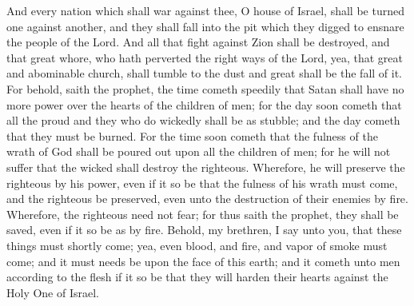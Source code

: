 And every nation which shall war against thee, O house of Israel, shall be turned one against another, and they shall fall into the pit which they digged to ensnare the people of the Lord.  And all that fight against Zion shall be destroyed, and that great whore, who hath perverted the right ways of the Lord, yea, that great and abominable church, shall tumble to the dust and great shall be the fall of it.
\bverse \iffalse For behold, saith the prophet, the time cometh speedily that Satan shall have no more power over the hearts of the children of men; for the day soon cometh that all the proud and they who do wickedly shall be as stubble; and the day cometh that they must be burned. \fi
For behold, saith the prophet, the time cometh speedily that Satan shall have no more power over the hearts of the children of men; for the day soon cometh that all the proud and they who do wickedly shall be as stubble; and the day cometh that they must be burned.
\bverse \iffalse For the time soon cometh that the fulness of the wrath of God shall be poured out upon all the children of men; for he will not suffer that the wicked shall destroy the righteous. \fi
For the time soon cometh that the fulness of the wrath of God shall be poured out upon all the children of men; for he will not suffer that the wicked shall destroy the righteous.
\bverse \iffalse Wherefore, he will preserve the righteous by his power, even if it so be that the fulness of his wrath must come, and the righteous be preserved, even unto the destruction of their enemies by fire. Wherefore, the righteous need not fear; for thus saith the prophet, they shall be saved, even if it so be as by fire. \fi
Wherefore, he will preserve the righteous by his power, even if it so be that the fulness of his wrath must come, and the righteous be preserved, even unto the destruction of their enemies by fire. Wherefore, the righteous need not fear; for thus saith the prophet, they shall be saved, even if it so be as by fire.
\bverse \iffalse Behold, my brethren, I say unto you, that these things must shortly come; yea, even blood, and fire, and vapor of smoke must come; and it must needs be upon the face of this earth; and it cometh unto men according to the flesh if it so be that they will harden their hearts against the Holy One of Israel. \fi
Behold, my brethren, I say unto you, that these things must shortly come; yea, even blood, and fire, and vapor of smoke must come; and it must needs be upon the face of this earth; and it cometh unto men according to the flesh if it so be that they will harden their hearts against the Holy One of Israel.
